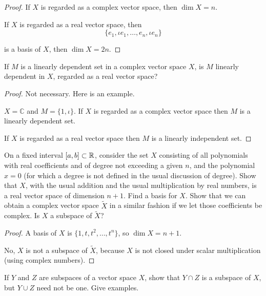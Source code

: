 \begin{proof}
    If $X$ is regarded as a complex vector space, then $\dim X = n$.

    If $X$ is regarded as a real vector space, then
    \[
        \{ e_{1}, \iota e_{1}, \ldots, e_{n}, \iota e_{n} \}
    \]

    is a basis of $X$, then $\dim X = 2n$.
\end{proof}

\begin{exercise}\label{chapter2:section1:exercise8}
    If $M$ is a linearly dependent set in a complex vector space $X$, is $M$ linearly dependent in $X$, regarded as a real vector space?
\end{exercise}

\begin{proof}
    Not necessary. Here is an example.

    $X = \mathbb{C}$ and $M = \{ 1, \iota \}$. If $X$ is regarded as a complex vector space then $M$ is a linearly dependent set.

    If $X$ is regarded as a real vector space then $M$ is a linearly independent set.
\end{proof}

\begin{exercise}\label{chapter2:section1:exercise9}
    On a fixed interval $\left[{a, b}\right]\subset\mathbb{R}$, consider the set $X$ consisting of all polynomials with real coefficients and of degree not exceeding a given $n$, and the polynomial $x = 0$ (for which a degree is not defined in the usual discussion of degree). Show that $X$, with the usual addition and the usual multiplication by real numbers, is a real vector space of
    dimension $n + 1$. Find a basis for $X$. Show that we can obtain a
    complex vector space $\tilde{X}$ in a similar fashion if we let those coefficients be complex. Is $X$ a subspace of $\tilde{X}$?
\end{exercise}

\begin{proof}
    A basis of $X$ is $\{ 1, t, t^{2}, \ldots, t^{n} \}$, so $\dim X = n + 1$.

    No, $X$ is not a subspace of $\tilde{X}$, because $X$ is not closed under scalar multiplication (using complex numbers).
\end{proof}

\begin{exercise}\label{chapter2:section1:exercise10}
    If $Y$ and $Z$ are subspaces of a vector space $X$, show that $Y\cap Z$ is a subspace of $X$, but $Y\cup Z$ need not be one. Give examples.
\end{exercise}


